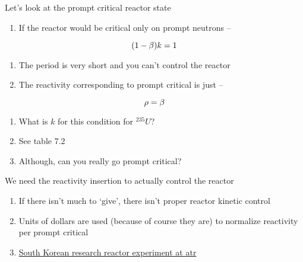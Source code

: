 \documentclass[aspectratio=1610,pdftex,dvipsnames,compress,xcolor={dvipsnames}]{beamer}
\newcommand{\acs}{\acrshort} %
\begin{document}
\addtocounter{framenumber}{-1} 
\begin{frame}{Let's look at the prompt critical reactor state}
    \begin{enumerate}[series=outerlist,topsep=0pt,itemsep=21pt,leftmargin=*,label=(\arabic*)]
        \item[]If the reactor would be critical only on prompt neutrons --
    \end{enumerate}

    \vspace*{\fill}

    \begin{equation}
        \LARGE
        (1-\beta) k = 1
    \end{equation}

    \vspace*{\fill}

    \begin{enumerate}[series=outerlist,topsep=0pt,itemsep=21pt,leftmargin=*,label=(\arabic*)]
        \item[]The period is very short and you can't control the reactor
        \item[]The reactivity corresponding to prompt critical is just --
    \end{enumerate}

    \vspace*{\fill}

    \begin{equation}
        \LARGE
        \rho = \beta
    \end{equation}

    \vspace*{\fill}

    \begin{enumerate}[series=outerlist,topsep=0pt,itemsep=21pt,leftmargin=*,label=(\arabic*)]
        \item[]What is $k$ for this condition for $^{235}U$?
        \item[]See table 7.2
        \item[]Although, can you really go prompt critical?
    \end{enumerate}
\end{frame}


\begin{frame}{We need the reactivity insertion to actually control the reactor}
    \begin{enumerate}[series=outerlist,topsep=0pt,itemsep=21pt,leftmargin=*,label=(\arabic*)]
        \item[]If there isn't much to `give', there isn't proper reactor kinetic control
        \item[]Units of dollars are used (because of course they are) to normalize reactivity per prompt critical
        \item[]\href{https://www.osti.gov/servlets/purl/1374731}{South Korean research reactor experiment at \acs{atr}}
    \end{enumerate}
\end{frame}
\end{document}
